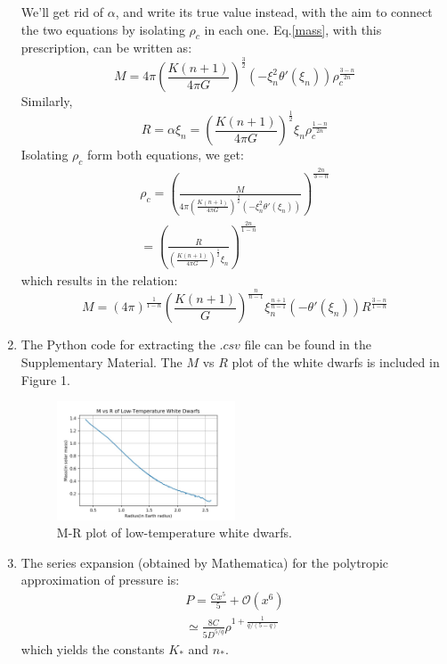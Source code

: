\documentclass[aps,twocolumn,showpacs,preprintnumbers,nofootinbib,prl,superscriptaddress,groupedaddress]{revtex4-2}
\begin{document}
\begin{enumerate}[label=(\alph*)]
    We'll get rid of $\alpha$, and write its true value instead, with the aim to connect the two equations by isolating $\rho_{c}$ in each one. Eq.\eqref{mass}, with this prescription, can be written as:
    \begin{equation}
        M = 4\pi \left(\frac{K(n+1)}{4\pi G}\right)^{\frac{3}{2}} \left(-\xi_{n}^{2}\theta '(\xi_{n})\right) \rho_{c}^{\frac{3-n}{2n}}
    \end{equation}
    Similarly, 
    \begin{equation}
        R = \alpha\xi_{n} = \left(\frac{K(n+1)}{4\pi G}\right)^{\frac{1}{2}} \xi_{n} \rho_{c}^{\frac{1-n}{2n}}
    \end{equation}
    Isolating $\rho_{c}$ form both equations, we get:
    \begin{align}
        \rho_{c} = \left( \frac{M}{4\pi \left(\frac{K(n+1)}{4\pi G}\right)^{\frac{3}{2}} \left(-\xi_{n}^{2}\theta '(\xi_{n})\right)} \right)^{\frac{2n}{3-n}}     \nonumber \\
        = \left( \frac{R}{\left(\frac{K(n+1)}{4\pi G}\right)^{\frac{1}{2}} \xi_{n}} \right)^{\frac{2n}{1-n}}
    \end{align}
    which results in the relation:
    \begin{equation}
        M = (4\pi)^{\frac{1}{1-n}} \left(\frac{K(n+1)}{G}\right)^{\frac{n}{n-1}} \xi_{n}^{\frac{n+1}{n-1}} (-\theta '(\xi_{n}) ) R^{\frac{3-n}{1-n}}
    \end{equation}
    \item The Python code for extracting the $.csv$ file can be found in the Supplementary Material. The $M$ vs $R$ plot of the white dwarfs is included in Figure 1.
    \begin{figure}[H] 
    \centering
    \includegraphics[width=0.5\textwidth]{WDMR.jpg}
    \caption{M-R plot of low-temperature white dwarfs.}
    \end{figure}
    \item The series expansion (obtained by Mathematica) for the polytropic approximation of pressure is:
    \begin{align}
        P = \frac{Cx^{5}}{5} + \mathcal{O}(x^{6}) \nonumber \\
        \simeq \frac{8C}{5D^{{5} / {q}}} \rho^{1 + \frac{1}{{q} / {(5-q)}}}
    \end{align}
    which yields the constants $K_{*}$ and $n_{*}$.
    

\end{enumerate}
\end{document}
